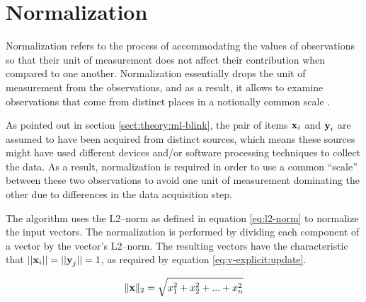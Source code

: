 \section{Normalization} \label{sect:theory:norm}

Normalization refers to the process of accommodating the values of observations so that their unit of measurement does not affect their contribution when compared to one another. Normalization essentially drops the unit of measurement from the observations, and as a result, it allows to examine observations that come from distinct places in a notionally common scale \cite{book:intro-to-dm}. \newline

As pointed out in section \ref{sect:theory:ml-blink}, the pair of items $\boldsymbol{\mathbf{x}}_i$ and $\boldsymbol{\mathbf{y}}_i$ are assumed to have been acquired from distinct sources, which means these sources might have used different devices and/or software processing techniques to collect the data. As a result, normalization is required in order to use a common ``scale'' between these two observations to avoid one unit of measurement dominating the other due to differences in the data acquisition step. \newline

The \mlblink algorithm uses the L2--norm as defined in equation \ref{eq:l2-norm} to normalize the input vectors. The normalization is performed by dividing each component of a vector by the vector's L2--norm. The resulting vectors have the characteristic that $||\boldsymbol{\mathbf{x}}_i ||=||\boldsymbol{\mathbf{y}}_j ||=1$, as required by equation \ref{eq:v-explicit:update}.

\begin{equation} \label{eq:l2-norm}
    \lVert \boldsymbol{\mathbf{x}} \rVert_{2} = \sqrt{x^2_1 + x^2_2 + ... + x^2_n}
\end{equation}